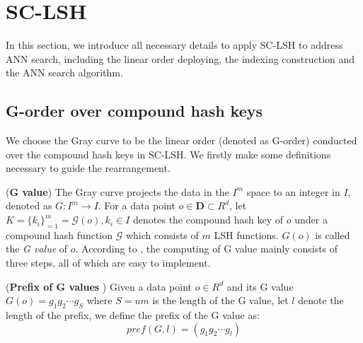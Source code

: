 \documentclass[twocolumn]{svjour3}          %
\begin{document}
\section{SC-LSH}\label{sec:sclsh}
In this section, we introduce all necessary details to apply SC-LSH to address ANN search, including the linear order deploying, the indexing construction and the ANN search algorithm.

\subsection{G-order over compound hash keys}\label{ssec:linearorder}
We choose the Gray curve to be the linear order (denoted as G-order) conducted over the compound hash keys in SC-LSH. We firstly make some definitions necessary to guide the rearrangement.

\begin{definition}
\label{def:g-order}
(\textbf{G value}) The Gray curve projects the data in the $I^m$ space to an integer in $I$, denoted as $G:I^m\rightarrow I$. For a data point $o\in \textbf{D} \subset R^d$, let $K=\{k_i\}_{=1}^m=\mathcal{G}(o), k_i \in I$ denotes the compound hash key of $o$ under a compound hash function $\mathcal{G}$ which consists of $m$ LSH functions. $G(o)$ is called the \emph{G value} of $o$. According to \cite{Faloutsos1989Fractals}, the computing of G value mainly consists of three steps, all of which are easy to implement.
\end{definition}


\begin{definition}
\label{def:zprefix}
(\textbf{Prefix of G values }) Given a data point $o\in R^d$ and its G value $G(o)=g_1g_2\cdots g_S$ where $S=um$ is the length of the G value, let $l$ denote the length of the prefix, we define the prefix of the G value as:
\begin{equation}
\label{eq:zprefix}
pref(G,l)=(g_1g_2\cdots g_l)
\end{equation}
\end{definition}
\end{document}
